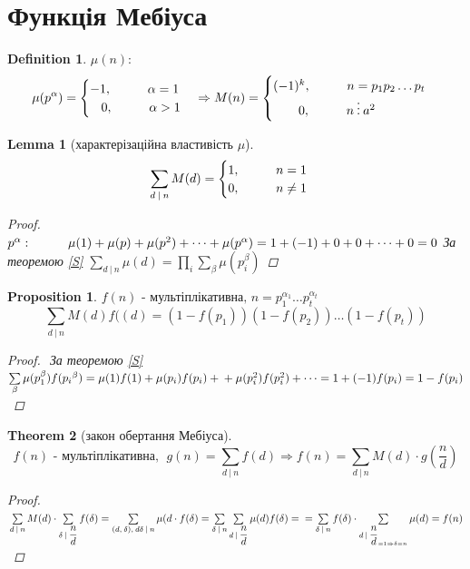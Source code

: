 \documentclass[a4paper,12pt, centered]{bookest}
\newtheorem{theorem}{Theorem}[section]
\newtheorem{lemma}[theorem]{Lemma}
\newtheorem{definition}{Definition}[section]
\newtheorem*{prop*}{Proposition}
\newcommand\tab[1][1cm]{\hspace*{#1}}
\begin{document}
\section{Функція Мебіуса}
\begin{definition}
	$\mu(n):$ $$\mu(p^\alpha)=\begin{cases}
		-1,\tab \alpha=1\\\>\>\>\>0,\tab\alpha>1
	\end{cases}\Rightarrow M(n)=\begin{cases}
		(-1)^k,\tab n=p_1p_2\dots p_t\\\>\>\>\>\>\>\>\>\>0,\tab n\>\vdots\>a^2
	\end{cases}$$
\end{definition}
\begin{lemma}[характерізаційна властивість $\mu$]
	$$\sum\limits_{d\>|\>n}M(d)=\begin{cases}
		1,\tab n=1\\0,\tab n\neq 1
	\end{cases}$$
	\begin{proof}
		$\\p^\alpha:\tab \mu(1)+\mu(p)	+\mu(p^2)+\dots+\mu(p^\alpha)=1+(-1)+0+0+\dots+0=0\\$ За теоремою \ref{S} $\sum\limits_{d\>|\>n}\mu(d)=\prod\limits_{i}\sum\limits_{\beta}\mu(p_i^\beta)$
	\end{proof}
\end{lemma}
\begin{prop*}
$f(n)\textrm{ - мультіплікативна, }n=p_1^{\alpha_1}\dots p_t^{\alpha_t}$
$$\sum\limits_{d\>|\>n}M(d)f((d)=(1-f(p_1))(1-f(p_2))\dots(1-f(p_t))$$
\begin{proof}$ $
	За теоремою \ref{S} $\sum\limits_{\beta}\mu(p_1^{\beta})f(p_i{^\beta})=\mu(1)f(1)+\mu(p_i)f(p_i)+\\+\mu(p_i^2)f(p_i^2)+\dots=1+(-1)f(p_i)=1-f(p_i)$
\end{proof}
\end{prop*}
\begin{theorem}[закон обертання Мебіуса]
	$$f(n) \textrm{ - мультіплікативна},\>\>g(n)	=\sum\limits_{d\>|\>n}f(d)\Rightarrow f(n)=\sum\limits_{d\>|\>n}M(d)\cdot g(\dfrac nd)$$
	\begin{proof}
		$\\\sum\limits_{d\>|\>n}M(d)\cdot\sum\limits_{\delta\>|\>\dfrac nd}f(\delta)=\sum\limits_{(d,\>\delta),\>d\delta\>|\>n}\mu(	d\cdot f(\delta)=\sum\limits_{\delta\>|\>n}\sum\limits_{d\>|\>\dfrac nd}\mu(d)f(\delta)=\\=\sum\limits_{\delta\>|\>n}f(\delta)\cdot\sum\limits_{d\>|\>\dfrac nd_{=1\Rightarrow\delta=n}}\mu(d)=f(n)$
	\end{proof}
\end{theorem}
\end{document}
